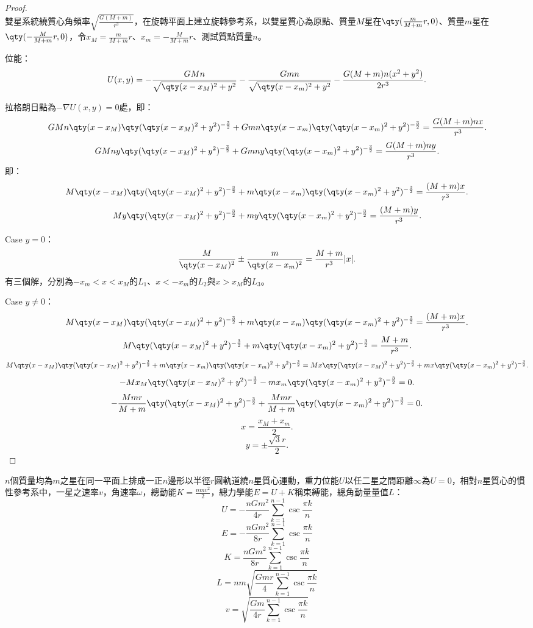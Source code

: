 \documentclass[a4paper,12pt]{article}
\begin{document}
\begin{proof}\mbox{}\\
雙星系統繞質心角頻率$\sqrt{\frac{G(M+m)}{r^3}}$，在旋轉平面上建立旋轉參考系，以雙星質心為原點、質量$M$星在$\qty(\frac{m}{M+m}r,0)$、質量$m$星在$\qty(-\frac{M}{M+m}r,0)$，令$x_M=\frac{m}{M+m}r$、$x_m=-\frac{M}{M+m}r$、測試質點質量$n$。

位能：
\[U(x,y)=-\frac{GMn}{\sqrt{\qty(x-x_M)^2+y^2}}-\frac{Gmn}{\sqrt{\qty(x-x_m)^2+y^2}}-\frac{G(M+m)n(x^2+y^2)}{2r^3}.\]

拉格朗日點為$-\nabla U(x,y)=0$處，即：
\[GMn\qty(x-x_M)\qty(\qty(x-x_M)^2+y^2)^{-\frac{3}{2}}+Gmn\qty(x-x_m)\qty(\qty(x-x_m)^2+y^2)^{-\frac{3}{2}}=\frac{G(M+m)nx}{r^3}.\]
\[GMny\qty(\qty(x-x_M)^2+y^2)^{-\frac{3}{2}}+Gmny\qty(\qty(x-x_m)^2+y^2)^{-\frac{3}{2}}=\frac{G(M+m)ny}{r^3}.\]
即：
\[M\qty(x-x_M)\qty(\qty(x-x_M)^2+y^2)^{-\frac{3}{2}}+m\qty(x-x_m)\qty(\qty(x-x_m)^2+y^2)^{-\frac{3}{2}}=\frac{(M+m)x}{r^3}.\]
\[My\qty(\qty(x-x_M)^2+y^2)^{-\frac{3}{2}}+my\qty(\qty(x-x_m)^2+y^2)^{-\frac{3}{2}}=\frac{(M+m)y}{r^3}.\]

Case $y=0$：
\[\frac{M}{\qty(x-x_M)^2}\pm\frac{m}{\qty(x-x_m)^2}=\frac{M+m}{r^3}|x|.\]
有三個解，分別為$-x_m<x<x_M$的$L_1$、$x<-x_m$的$L_2$與$x>x_M$的$L_3$。

Case $y\neq 0$：
\[M\qty(x-x_M)\qty(\qty(x-x_M)^2+y^2)^{-\frac{3}{2}}+m\qty(x-x_m)\qty(\qty(x-x_m)^2+y^2)^{-\frac{3}{2}}=\frac{(M+m)x}{r^3}.\]
\[M\qty(\qty(x-x_M)^2+y^2)^{-\frac{3}{2}}+m\qty(\qty(x-x_m)^2+y^2)^{-\frac{3}{2}}=\frac{M+m}{r^3}.\]
\[M\qty(x-x_M)\qty(\qty(x-x_M)^2+y^2)^{-\frac{3}{2}}+m\qty(x-x_m)\qty(\qty(x-x_m)^2+y^2)^{-\frac{3}{2}}=Mx\qty(\qty(x-x_M)^2+y^2)^{-\frac{3}{2}}+mx\qty(\qty(x-x_m)^2+y^2)^{-\frac{3}{2}}.\]
\[-Mx_M\qty(\qty(x-x_M)^2+y^2)^{-\frac{3}{2}}-mx_m\qty(\qty(x-x_m)^2+y^2)^{-\frac{3}{2}}=0.\]
\[-\frac{Mmr}{M+m}\qty(\qty(x-x_M)^2+y^2)^{-\frac{3}{2}}+\frac{Mmr}{M+m}\qty(\qty(x-x_m)^2+y^2)^{-\frac{3}{2}}=0.\]
\[x=\frac{x_M+x_m}{2}.\]
\[y=\pm\frac{\sqrt{3}r}{2}.\]
\end{proof}
$n$個質量均為$m$之星在同一平面上排成一正$n$邊形以半徑$r$圓軌道繞$n$星質心運動，重力位能$U$以任二星之間距離$\infty$為$U=0$，相對$n$星質心的慣性參考系中，一星之速率$v$，角速率$\omega$，總動能$K=\frac{nmv^2}{2}$，總力學能$E=U+K$稱束縛能，總角動量量值$L$：
\[U=-\frac{nGm^2}{4r}\sum_{k=1}^{n-1}\csc\frac{\pi k}{n}\]
\[E=-\frac{nGm^2}{8r}\sum_{k=1}^{n-1}\csc\frac{\pi k}{n}\]
\[K=\frac{nGm^2}{8r}\sum_{k=1}^{n-1}\csc\frac{\pi k}{n}\]
\[L=nm\sqrt{\frac{Gmr}{4}\sum_{k=1}^{n-1}\csc\frac{\pi k}{n}}\]
\[v=\sqrt{\frac{Gm}{4r}\sum_{k=1}^{n-1}\csc\frac{\pi k}{n}}\]
\end{document}
